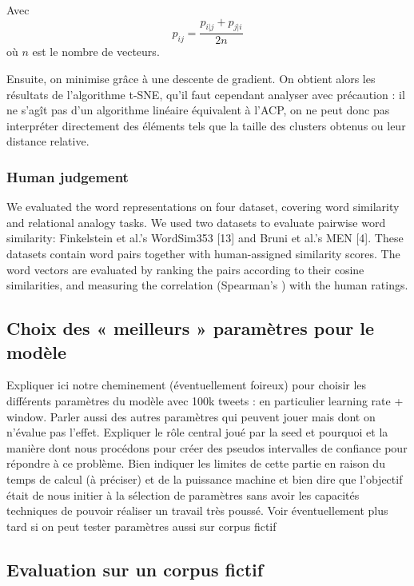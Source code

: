 \documentclass[11pt,french,french]{article}
\begin{document}
Avec \[p_{ij} = \frac{p_{i|j} + p_{j|i}}{2n}\] où \(n\) est le nombre de
vecteurs.

Ensuite, on minimise grâce à une descente de gradient. On obtient alors
les résultats de l'algorithme t-SNE, qu'il faut cependant analyser avec
précaution : il ne s'agît pas d'un algorithme linéaire équivalent à
l'ACP, on ne peut donc pas interpréter directement des éléments tels que
la taille des clusters obtenus ou leur distance relative.

\hypertarget{human-judgement}{%
\subsubsection{Human judgement}\label{human-judgement}}

We evaluated the word representations on four dataset, covering word
similarity and relational analogy tasks. We used two datasets to
evaluate pairwise word similarity: Finkelstein et al.'s WordSim353
{[}13{]} and Bruni et al.'s MEN {[}4{]}. These datasets contain word
pairs together with human-assigned similarity scores. The word vectors
are evaluated by ranking the pairs according to their cosine
similarities, and measuring the correlation (Spearman's ) with the human
ratings.

\hypertarget{choix-des-meilleurs-paramuxe8tres-pour-le-moduxe8le}{%
\subsection{Choix des « meilleurs » paramètres pour le
modèle}\label{choix-des-meilleurs-paramuxe8tres-pour-le-moduxe8le}}

Expliquer ici notre cheminement (éventuellement foireux) pour choisir
les différents paramètres du modèle avec 100k tweets : en particulier
learning rate + window. Parler aussi des autres paramètres qui peuvent
jouer mais dont on n'évalue pas l'effet. Expliquer le rôle central joué
par la seed et pourquoi et la manière dont nous procédons pour créer des
pseudos intervalles de confiance pour répondre à ce problème. Bien
indiquer les limites de cette partie en raison du temps de calcul (à
préciser) et de la puissance machine et bien dire que l'objectif était
de nous initier à la sélection de paramètres sans avoir les capacités
techniques de pouvoir réaliser un travail très poussé. Voir
éventuellement plus tard si on peut tester paramètres aussi sur corpus
fictif

\hypertarget{evaluation-sur-un-corpus-fictif}{%
\subsection{Evaluation sur un corpus
fictif}\label{evaluation-sur-un-corpus-fictif}}
\end{document}
